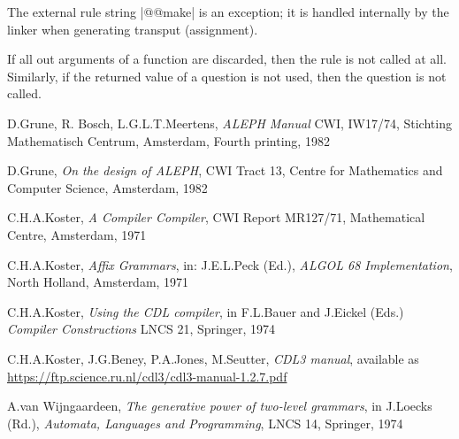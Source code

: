 \documentclass{article}
\begin{document}
The external rule string \pp|@@make| is an exception; it is handled
internally by the linker when generating transput (assignment).

If all out arguments of a function are discarded, then the rule is not
called at all. Similarly, if the returned value of a question is not used,
then the question is not called.

\begin{thebibliography}{99}
D.Grune, R. Bosch, L.G.L.T.Meertens,
\emph{ALEPH Manual}
CWI, IW17/74, Stichting Mathematisch Centrum, Amsterdam, 
Fourth printing, 1982

D.Grune,
\emph{On the design of ALEPH},
CWI Tract 13, Centre for Mathematics and Computer Science, Amsterdam, 1982

C.H.A.Koster,
\emph{A Compiler Compiler},
CWI Report MR127/71,
Mathematical Centre, Amsterdam, 1971

C.H.A.Koster,
\emph{Affix Grammars}, in:
J.E.L.Peck (Ed.), \emph{ALGOL 68 Implementation}, North Holland, Amsterdam,
1971

C.H.A.Koster,
\emph{Using the CDL compiler}, in
F.L.Bauer and J.Eickel (Eds.) \emph{Compiler Constructions}
LNCS 21, Springer, 1974

C.H.A.Koster, J.G.Beney, P.A.Jones, M.Seutter,
\emph{CDL3 manual},
available as \url{https://ftp.science.ru.nl/cdl3/cdl3-manual-1.2.7.pdf}

A.van Wijngaardeen,
\emph{The generative power of two-level grammars}, in
J.Loecks (Rd.), \emph{Automata, Languages and Programming},
LNCS 14, Springer, 1974


\end{thebibliography}
\end{document}
